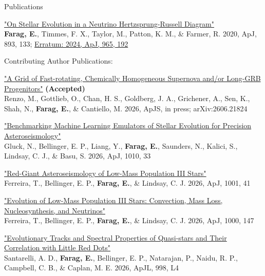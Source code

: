\begin{rSection}{Publications}
\begin{revnumerate}
\item \href{https://ui.adsabs.harvard.edu/abs/2020ApJ...893..133F/abstract}{"On Stellar Evolution in a Neutrino Hertzsprung-Russell Diagram"}
\\ \textbf{Farag, E.}, Timmes, F. X., Taylor, M., Patton, K. M., \& Farmer, R. 2020, ApJ, 893, 133; \href{https://ui.adsabs.harvard.edu/abs/2024ApJ...965..192F/abstract}{Erratum: 2024, ApJ, 965, 192}

\end{revnumerate}

Contributing Author Publications:
\begin{revnumerate}
\item \href{https://ui.adsabs.harvard.edu/abs/2026arXiv260621824R/abstract}{"A Grid of Fast-rotating, Chemically Homogeneous Supernova and/or Long-GRB Progenitors"} \textbf{(Accepted)}
\\ Renzo, M., Gottlieb, O., Chan, H. S., Goldberg, J. A., Grichener, A., Sen, K., Shah, N., \textbf{Farag, E.}, \& Cantiello, M. 2026, ApJS, in press; arXiv:2606.21824

\item \href{https://ui.adsabs.harvard.edu/abs/2026ApJ..1010...33G/abstract}{"Benchmarking Machine Learning Emulators of Stellar Evolution for Precision Asteroseismology"}
\\ Gluck, N., Bellinger, E. P., Liang, Y., \textbf{Farag, E.}, Saunders, N., Kalici, S., Lindsay, C. J., \& Basu, S. 2026, ApJ, 1010, 33

\item \href{https://ui.adsabs.harvard.edu/abs/2026ApJ..1001...41F/abstract}{"Red-Giant Asteroseismology of Low-Mass Population III Stars"}
\\ Ferreira, T., Bellinger, E. P., \textbf{Farag, E.}, \& Lindsay, C. J. 2026, ApJ, 1001, 41

\item \href{https://ui.adsabs.harvard.edu/abs/2026ApJ..1000..147F/abstract}{"Evolution of Low-Mass Population III Stars: Convection, Mass Loss, Nucleosynthesis, and Neutrinos"}
\\ Ferreira, T., Bellinger, E. P., \textbf{Farag, E.}, \& Lindsay, C. J. 2026, ApJ, 1000, 147

\item \href{https://ui.adsabs.harvard.edu/abs/2026ApJ...998L...4S/abstract}{"Evolutionary Tracks and Spectral Properties of Quasi-stars and Their Correlation with Little Red Dots"}
\\ Santarelli, A. D., \textbf{Farag, E.}, Bellinger, E. P., Natarajan, P., Naidu, R. P., Campbell, C. B., \& Caplan, M. E. 2026, ApJL, 998, L4


\end{revnumerate}
\end{rSection}
